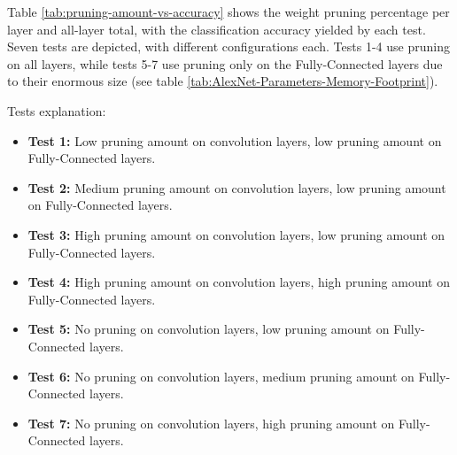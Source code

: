 Table \ref{tab:pruning-amount-vs-accuracy} shows the weight pruning percentage per layer and all-layer total, with the classification accuracy yielded by each test. Seven tests are depicted, with different configurations each. Tests 1-4 use pruning on all layers, while tests 5-7 use pruning only on the Fully-Connected layers due to their enormous size (see table \ref{tab:AlexNet-Parameters-Memory-Footprint}).

Tests explanation:
\begin{itemize}
	\item \textbf{Test 1:} Low pruning amount on convolution layers, low pruning amount on Fully-Connected layers.
	\item \textbf{Test 2:} Medium pruning amount on convolution layers, low pruning amount on Fully-Connected layers.
	\item \textbf{Test 3:} High pruning amount on convolution layers, low pruning amount on Fully-Connected layers.
	\item \textbf{Test 4:} High pruning amount on convolution layers, high pruning amount on Fully-Connected layers.
	\item \textbf{Test 5:} No pruning on convolution layers, low pruning amount on Fully-Connected layers.
	\item \textbf{Test 6:} No pruning on convolution layers, medium pruning amount on Fully-Connected layers.
	\item \textbf{Test 7:} No pruning on convolution layers, high pruning amount on Fully-Connected layers.
\end{itemize}

